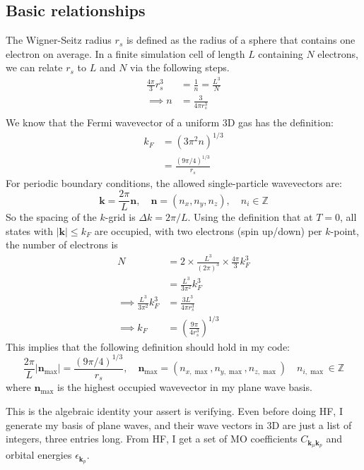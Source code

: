 \subsection{Basic relationships}
The Wigner-Seitz radius $r_s$ is defined as the radius of a sphere that contains one electron on average. In a finite simulation cell of length $L$ containing $N$ electrons, we can relate $r_s$ to $L$ and $N$ via the following steps.
\begin{align}
    \frac{4 \pi}{3} r_s^3&=\frac{1}{n}=\frac{L^3}{N}\\
\implies n&=\frac{3}{4 \pi r_s^3} \\
\end{align}
We know that the Fermi wavevector of a uniform 3D gas has the definition:
\begin{align}
    k_F&=\left(3 \pi^2 n\right)^{1 / 3}\\
&=\frac{(9 \pi / 4)^{1 / 3}}{r_s}
\end{align}
For periodic boundary conditions, the allowed single-particle wavevectors are:
\begin{equation}
    \mathbf{k}=\frac{2 \pi}{L} \mathbf{n}, \quad \mathbf{n}=\left(n_x, n_y, n_z\right), \quad n_i \in \mathbb{Z}
\end{equation}
So the spacing of the $k$-grid is $\Delta k=2 \pi / L$. Using the definition that at $T=0$, all states with $|\mathbf{k}| \leq k_F$ are occupied, with two electrons (spin up/down) per $k$-point, the number of electrons is
\begin{align}
    N&=2 \times \frac{L^3}{(2 \pi)^3} \times \frac{4 \pi}{3} k_F^3\\
&= \frac{L^3}{3 \pi^2} k_F^3 \\
\implies \frac{L^3}{3 \pi^2} k_F^3 &= \frac{3 L^3}{4 \pi r_s^3} \\
\implies k_F &= \left(\frac{9 \pi}{4 r_s^3}\right)^{1 / 3}
\end{align}
This implies that the following definition should hold in my code:
\begin{equation}
    \frac{2 \pi}{L}\left|\mathbf{n}_{\max }\right|=\frac{(9 \pi / 4)^{1 / 3}}{r_s}, \quad \mathbf{n}_{\max }=\left(n_{x, \max }, n_{y, \max }, n_{z, \max }\right) \quad n_{i, \max } \in \mathbb{Z}
\end{equation}
where $\mathbf{n}_{\max }$ is the highest occupied wavevector in my plane wave basis.

This is the algebraic identity your assert is verifying.
Even before doing HF, I generate my basis of plane waves, and their wave vectors in 3D are just a list of integers, three entries long. From HF, I get a set of MO coefficients $C_{\bm{k}_\mu \bm{k}_p}$ and orbital energies $\epsilon_{\bm{k}_p}$.
